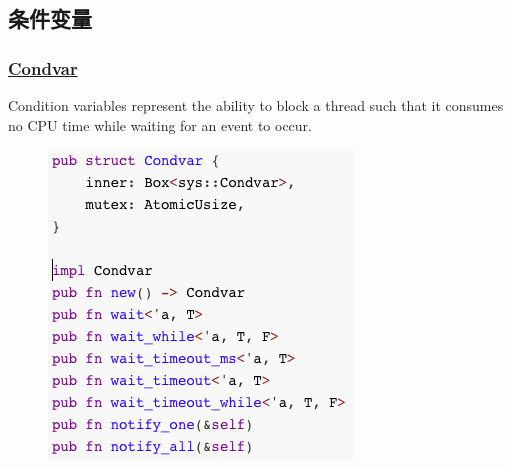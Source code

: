 \subsection{条件变量} %
\begin{frame}[fragile]
    \frametitle{\href{https://doc.rust-lang.org/std/sync/struct.Condvar.html}{Condvar}}

Condition variables represent the ability to block a thread such that it consumes no CPU time while waiting for an event to occur. \pause

    \begin{figure}
    \includegraphics[width=0.37\linewidth]{figs/struct-condvar.png}
    \end{figure}

\end{frame}
% 
% 
% 
% 
% 
% 
% 
